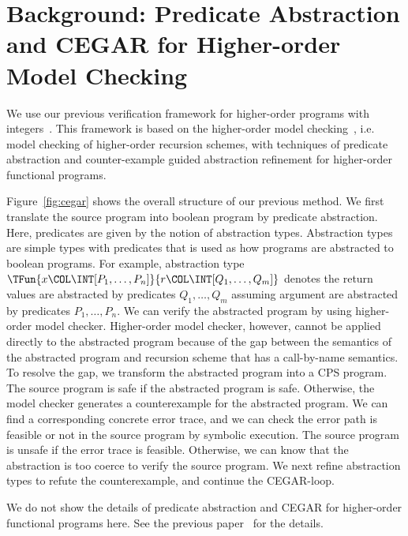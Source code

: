 \section{Background: Predicate Abstraction and CEGAR for Higher-order Model Checking}
\label{sec:model-check}
We use our previous verification framework for higher-order
programs with integers~\cite{KobayashiPLDI2011}.  This framework is
based on the higher-order model
checking~\cite{Ong2006,KobayashiPOPL2009}, i.e. model checking of
higher-order recursion schemes, with techniques of predicate abstraction
and counter-example guided abstraction refinement for higher-order
functional programs.

Figure~\ref{fig:cegar} shows the overall structure of our previous
method.  We first translate the source program into boolean program by
predicate abstraction.  Here, predicates are given by the notion of
abstraction types.  Abstraction types are simple types with predicates
that is used as how programs are abstracted to boolean programs.  For
example, abstraction type
$\TFun{x\COL\INT[P_1,\dots,P_n]}{r\COL\INT[Q_1,\dots,Q_m]}$ denotes the
return values are abstracted by predicates $Q_1,\dots,Q_m$ assuming
argument are abstracted by predicates $P_1,\dots, P_n$.  We can verify
the abstracted program by using higher-order model checker.
Higher-order model checker, however, cannot be applied directly to the
abstracted program because of the gap between the semantics of the
abstracted program and recursion scheme that has a call-by-name
semantics.  To resolve the gap, we transform the abstracted program into
a CPS program.  The source program is safe if the abstracted program is
safe.  Otherwise, the model checker generates a counterexample for the
abstracted program.  We can find a corresponding concrete error trace,
and we can check the error path is feasible or not in the source program
by symbolic execution.  The source program is unsafe if the error trace
is feasible.  Otherwise, we can know that the abstraction is too coerce
to verify the source program.  We next refine abstraction types to
refute the counterexample, and continue the CEGAR-loop.

We do not show the details of predicate abstraction and CEGAR for higher-order functional programs here.
See the previous paper~\cite{KobayashiPLDI2011} for the details.


